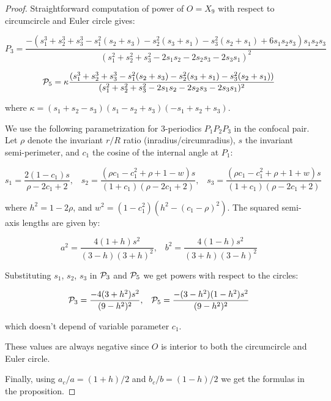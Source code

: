 \begin{proof}

Straightforward computation of power of $O=X_9$ with respect to circumcircle and Euler circle gives:

\[P_3 = \frac{ -(s_1^3 + s_2^3 + s_3^3 - s_1^2 (s_2 + s_3) - s_2^2 (s_3 + s_1)  - s_3^2 (s_2 + s_1) + 6 s_1 s_2 s_3) s_1 s_2 s_3 }{(s_1^2 + s_2^2 + s_3^2 - 2 s_1 s_2 - 2 s_2 s_3 - 2 s_3 s_1)^2 }\]

\[\P_5 = \kappa \frac{ (s_1^3 + s_2^3 + s_3^3 - s_1^2 (s_2 + s_3) - s_2^2 (s_3 + s_1)  - s_3^2 (s_2 + s_1))}{(s_1^2 + s_2^2 + s_3^2 - 2 s_1 s_2 - 2 s_2 s_3 - 2 s_3 s_1)^2 } \]

\noindent where $\kappa=(s_1 + s_2 - s_3)(s_1 - s_2 + s_3)(-s_1 + s_2 + s_3)$.

We use the following parametrization for 3-periodics $P_1P_2P_3$ in the confocal pair. Let $\rho$ denote the invariant $r/R$ ratio (inradius/circumradius), $s$ the invariant semi-perimeter, and $c_1$ the cosine of the internal angle at $P_1$:

\[ s_1 = \frac{2(1 - c_1) s}{\rho - 2 c_1 + 2},\;\;\;s_2 = \frac{(\rho c_1 - c_1^2 + \rho + 1 - w) s}{(1 + c_1)(\rho - 2 c_1 + 2)},\;\;\;s_3 = \frac{(\rho c_1 - c_1^2 + \rho + 1 + w) s}{(1 + c_1)(\rho - 2 c_1 + 2)}\]

\noindent where $h^2=1-2\rho$, and $w^2 = (1 - c_1^2) (h^2 - (c_1 - \rho)^2)$. The squared semi-axis lengths are given by: 

\[ a^2 = \frac{4(1 + h)s^2}{(3 - h)(3 + h)^2},\;\;\;b^2 = \frac{4(1 - h)s^2}{(3 + h)(3 - h)^2} \]

\noindent Substituting $s_1$, $s_2$, $s_3$ in $\P_3$ and $\P_5$ we get powers with respect to the circles:

\[ \P_3 = \frac{-4(3 + h^2) s^2}{(9 - h^2)^2},\;\;\;
\P_5 = \frac{-(3 - h^2)(1 - h^2)s^2}{(9 - h^2)^2} \]


which doesn't depend of variable parameter $c_1$.

These values are always negative since $O$ is interior to both the circumcircle and Euler circle.

Finally, using $a_c/a = (1 + h)/2$ and $b_c/b = (1 - h)/2$ we get the formulas in the proposition.


\end{proof}

